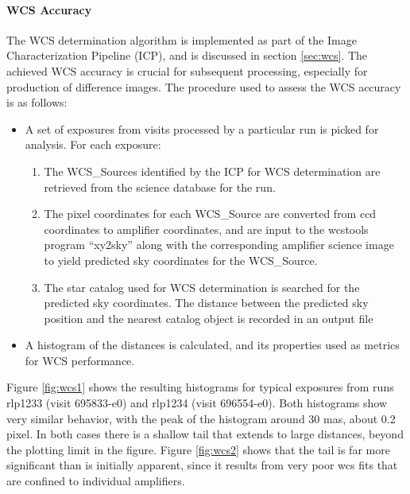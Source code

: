 \paragraph{WCS Accuracy}
The WCS determination algorithm is implemented as part of the Image
Characterization Pipeline (ICP), and is discussed in section \ref{sec:wcs}.
The achieved WCS accuracy is crucial for subsequent processing,
especially for production of difference images.  The procedure used to
assess the WCS accuracy is as follows:
\begin{itemize}

\item A set of exposures from visits processed by a particular run is
  picked for analysis. For each exposure:
\begin{enumerate}
\item The WCS\_Sources identified by the ICP for WCS determination are retrieved from the
  science database for the run.
\item The pixel coordinates for each WCS\_Source are converted from
  ccd coordinates to amplifier coordinates, and are input to the
  wcstools program ``xy2sky'' along with the corresponding amplifier
  science image to yield predicted sky coordinates for the
  WCS\_Source.
\item The star catalog used for WCS determination is searched for the
  predicted sky coordinates.  The distance between the predicted sky
  position and the nearest catalog object is recorded in an output file
\end{enumerate}
\item A histogram of the distances is calculated, and its properties
  used as metrics for WCS performance.
\end{itemize}

Figure \ref{fig:wcs1} shows the resulting histograms for typical
exposures from runs rlp1233 (visit 695833-e0) and rlp1234 (visit
696554-e0). Both histograms show very similar behavior, with the peak
of the histogram around 30 mas, about 0.2 pixel.  In both cases there
is a shallow tail that extends to large distances, beyond the plotting
limit in the figure.  Figure \ref{fig:wcs2} shows that the tail is
far more significant than is initially apparent, since it
results from very poor wcs fits that are confined to individual
amplifiers.


